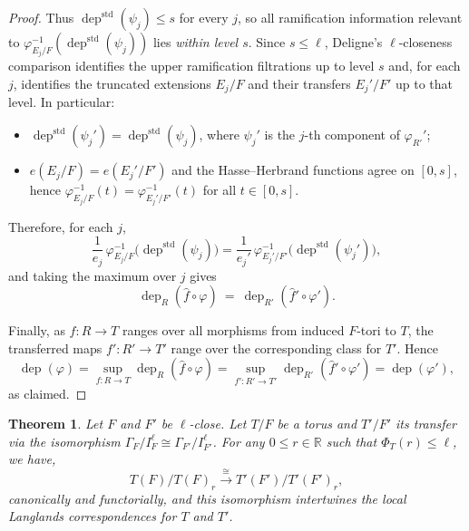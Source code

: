 \documentclass[american]{article}
\numberwithin{equation}{section}
\numberwithin{figure}{section}
\theoremstyle{plain}
\newtheorem{theorem}{Theorem}[section]
\theoremstyle{definition}
\theoremstyle{remark}
\DeclareMathOperator{\dep}{dep}
\DeclareMathOperator{\std}{std}
\begin{document}
\begin{proof}
Thus \(\dep^{\std}(\psi_j)\le s\) for every \(j\), so all ramification information relevant to
\(\varphi_{E_j/F}^{-1}(\dep^{\std}(\psi_j))\) lies \emph{within level \(s\)}.
Since \(s\le \ell\), Deligne's \(\ell\)-closeness comparison identifies the upper ramification filtrations
up to level \(s\) and, for each \(j\), identifies the truncated extensions \(E_j/F\) and their transfers \(E_j'/F'\)
up to that level. In particular:
\begin{itemize}
\item \(\dep^{\std}(\psi_j')=\dep^{\std}(\psi_j)\), where \(\psi_j'\) is the \(j\)-th component of \(\varphi_{R'}'\);
\item \(e(E_j/F)=e(E_j'/F')\) and the Hasse--Herbrand functions agree on \([0,s]\), hence
\(\varphi_{E_j/F}^{-1}(t)=\varphi_{E_j'/F'}^{-1}(t)\) for all \(t\in[0,s]\).
\end{itemize}
Therefore, for each \(j\),
\[
\frac{1}{e_j}\,\varphi_{E_j/F}^{-1}\bigl(\dep^{\std}(\psi_j)\bigr)
=
\frac{1}{e_j'}\,\varphi_{E_j'/F'}^{-1}\bigl(\dep^{\std}(\psi_j')\bigr),
\]
and taking the maximum over \(j\) gives
\[
\dep_R(\widehat f\circ\varphi)\ =\ \dep_{R'}(\widehat f'\circ\varphi').
\]

Finally, as \(f:R\to T\) ranges over all morphisms from induced \(F\)-tori to \(T\), the transferred maps
\(f':R'\to T'\) range over the corresponding class for \(T'\). Hence
\[
\dep(\varphi)
=\sup_{f:R\to T}\dep_R(\widehat f\circ\varphi)
=\sup_{f':R'\to T'}\dep_{R'}(\widehat f'\circ\varphi')
=\dep(\varphi'),
\]
as claimed.
\end{proof}



\begin{theorem}\label{thm:congruent-isom}
Let $F$ and $F'$ be $\ell$-close. Let $T/F$ be a torus and $T'/F'$ its transfer via the isomorphism $\Gamma_{F}/I_{F}^{\ell}\cong\Gamma_{F'}/I_{F'}^{\ell}$. For any $0\leq r\in \mathbb{R}$ such that $\Phi_T(r)\leq \ell$, we have,
\[
T(F)/T(F)_{r} \xrightarrow{\;\cong\;} T'(F')/T'(F')_{r},
\]
canonically and functorially, and this isomorphism intertwines the local Langlands correspondences for $T$ and $T'$. 
\end{theorem}
\end{document}
